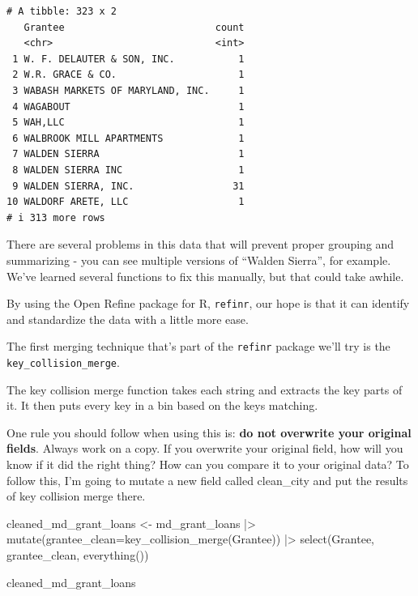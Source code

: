 \documentclass[
  letterpaper,
  DIV=11,
  numbers=noendperiod]{scrreprt}
\newenvironment{Shaded}{\begin{snugshade}}{\end{snugshade}}
\newcommand{\AttributeTok}[1]{\textcolor[rgb]{0.40,0.45,0.13}{#1}}
\newcommand{\FunctionTok}[1]{\textcolor[rgb]{0.28,0.35,0.67}{#1}}
\newcommand{\NormalTok}[1]{\textcolor[rgb]{0.00,0.23,0.31}{#1}}
\newcommand{\OtherTok}[1]{\textcolor[rgb]{0.00,0.23,0.31}{#1}}
\newcommand{\SpecialCharTok}[1]{\textcolor[rgb]{0.37,0.37,0.37}{#1}}
\begin{document}
\begin{verbatim}
# A tibble: 323 x 2
   Grantee                          count
   <chr>                            <int>
 1 W. F. DELAUTER & SON, INC.           1
 2 W.R. GRACE & CO.                     1
 3 WABASH MARKETS OF MARYLAND, INC.     1
 4 WAGABOUT                             1
 5 WAH,LLC                              1
 6 WALBROOK MILL APARTMENTS             1
 7 WALDEN SIERRA                        1
 8 WALDEN SIERRA INC                    1
 9 WALDEN SIERRA, INC.                 31
10 WALDORF ARETE, LLC                   1
# i 313 more rows
\end{verbatim}

There are several problems in this data that will prevent proper
grouping and summarizing - you can see multiple versions of ``Walden
Sierra'', for example. We've learned several functions to fix this
manually, but that could take awhile.

By using the Open Refine package for R, \texttt{refinr}, our hope is
that it can identify and standardize the data with a little more ease.

The first merging technique that's part of the \texttt{refinr} package
we'll try is the \texttt{key\_collision\_merge}.

The key collision merge function takes each string and extracts the key
parts of it. It then puts every key in a bin based on the keys matching.

One rule you should follow when using this is: \textbf{do not overwrite
your original fields}. Always work on a copy. If you overwrite your
original field, how will you know if it did the right thing? How can you
compare it to your original data? To follow this, I'm going to mutate a
new field called clean\_city and put the results of key collision merge
there.

\begin{Shaded}
\begin{Highlighting}[]
\NormalTok{cleaned\_md\_grant\_loans }\OtherTok{\textless{}{-}}\NormalTok{ md\_grant\_loans }\SpecialCharTok{|\textgreater{}}
  \FunctionTok{mutate}\NormalTok{(}\AttributeTok{grantee\_clean=}\FunctionTok{key\_collision\_merge}\NormalTok{(Grantee)) }\SpecialCharTok{|\textgreater{}}
  \FunctionTok{select}\NormalTok{(Grantee, grantee\_clean, }\FunctionTok{everything}\NormalTok{())}

\NormalTok{cleaned\_md\_grant\_loans}
\end{Highlighting}
\end{Shaded}
\end{document}
